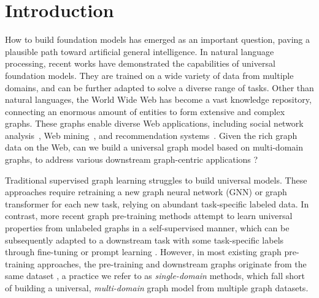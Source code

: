 \section{Introduction}\label{sec.intro}
How to build foundation models has emerged as an important question, paving a plausible path toward artificial general intelligence. In natural language processing, recent works \cite{touvron2023llama,achiam2023gpt} have demonstrated the capabilities of universal foundation models. They are trained on a wide variety of data from multiple domains, and can be further adapted to solve a diverse range of tasks. Other than natural languages, the World Wide Web has become a vast knowledge repository, connecting an enormous amount of entities to form extensive and complex graphs. These graphs enable diverse Web applications, including social network analysis~\cite{miyake2024netevolve,jiang2024ragraph}, Web mining~\cite{fangjf2023exgc,agarwal2022graphnli}, and recommendation systems~\cite{ma2024temporal,ni2024graph}. 
Given the rich graph data on the Web, can we build a universal graph model based on multi-domain graphs, to address various downstream graph-centric applications \cite{liu2023towards}? 

Traditional supervised graph learning struggles to build universal models. 
These approaches require retraining a new graph neural network (GNN) \cite{kipf2016semi,fangjf2023eva,yu2023learning} or graph transformer \cite{yun2019graph,rampavsek2022recipe,ying2021transformers} for each new task, relying on abundant task-specific labeled data. 
In contrast, more recent graph pre-training methods \cite{hu2020gpt,qiu2020gcc,velivckovic2018deep} attempt to learn universal properties from unlabeled graphs in a self-supervised manner, which can be subsequently adapted to a downstream task with some task-specific labels through fine-tuning \cite{kipf2016variational,velivckovic2018deep,qiu2020gcc} or prompt learning  \cite{liu2023graphprompt,sun2023all,yu2025node}.
However, in most existing graph pre-training approaches, the pre-training and downstream graphs originate from the same dataset \cite{velivckovic2018deep,you2020graph,liu2023graphprompt,sun2023all}, a practice we refer to as \emph{single-domain} methods, which fall short of building a universal, \emph{multi-domain} graph model from multiple graph datasets.


